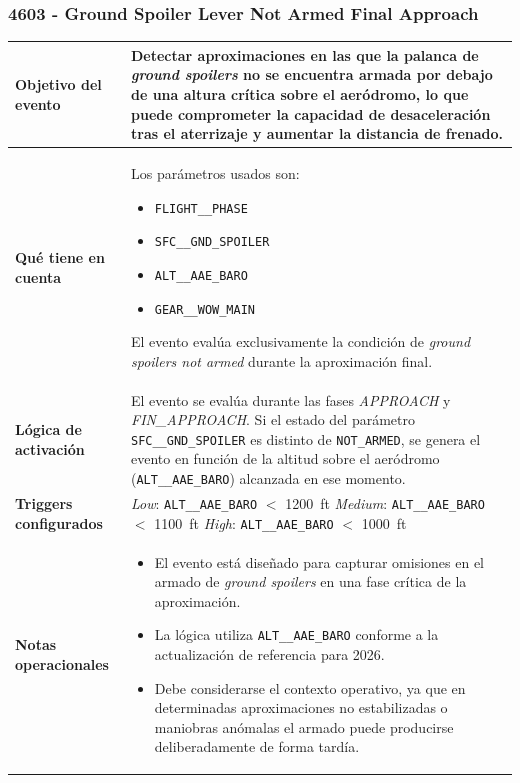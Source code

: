 \documentclass[11pt,a4paper]{article}
\begin{document}
	\subsubsection{4603 - Ground Spoiler Lever Not Armed Final Approach}
	\renewcommand{\arraystretch}{1.3}
	\begin{longtable}{p{5cm} p{9.5cm}}
		\hline
		\textbf{Objetivo del evento} &
		Detectar aproximaciones en las que la palanca de \textit{ground spoilers} no se encuentra armada por debajo de una altura crítica sobre el aeródromo, lo que puede comprometer la capacidad de desaceleración tras el aterrizaje y aumentar la distancia de frenado. \\
		\hline
		\textbf{Qué tiene en cuenta} & Los parámetros usados son:
		\begin{itemize}
			\item \texttt{FLIGHT\_\_PHASE}
			\item \texttt{SFC\_\_GND\_SPOILER}
			\item \texttt{ALT\_\_AAE\_BARO}
			\item \texttt{GEAR\_\_WOW\_MAIN}
		\end{itemize}
		El evento evalúa exclusivamente la condición de \textit{ground spoilers not armed} durante la aproximación final. \\
		\hline
		\textbf{Lógica de activación} &
		El evento se evalúa durante las fases \textit{APPROACH} y \textit{FIN\_APPROACH}. Si el estado del parámetro \texttt{SFC\_\_GND\_SPOILER} es distinto de \texttt{NOT\_ARMED}, se genera el evento en función de la altitud sobre el aeródromo (\texttt{ALT\_\_AAE\_BARO}) alcanzada en ese momento. \\
		\hline
		\textbf{Triggers configurados} &
		\textit{Low}: \texttt{ALT\_\_AAE\_BARO} $<$ \SI{1200}{ft} \newline
		\textit{Medium}: \texttt{ALT\_\_AAE\_BARO} $<$ \SI{1100}{ft} \newline
		\textit{High}: \texttt{ALT\_\_AAE\_BARO} $<$ \SI{1000}{ft} \\
		\hline
		\textbf{Notas operacionales} &
		\begin{itemize}
			\item El evento está diseñado para capturar omisiones en el armado de \textit{ground spoilers} en una fase crítica de la aproximación.
			\item La lógica utiliza \texttt{ALT\_\_AAE\_BARO} conforme a la actualización de referencia para 2026.
			\item Debe considerarse el contexto operativo, ya que en determinadas aproximaciones no estabilizadas o maniobras anómalas el armado puede producirse deliberadamente de forma tardía.
		\end{itemize} \\
		\hline
	\end{longtable} \newpage
	
\end{document}
